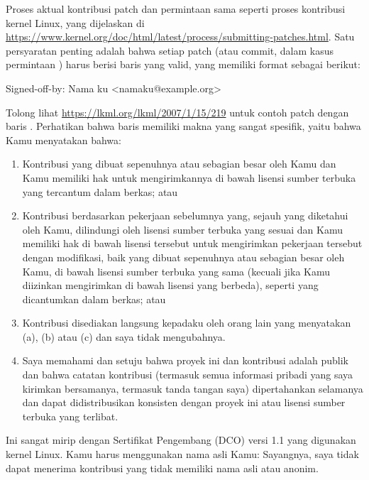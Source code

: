 Proses aktual kontribusi patch dan permintaan  sama seperti
proses kontribusi kernel Linux, yang dijelaskan di
\url{https://www.kernel.org/doc/html/latest/process/submitting-patches.html}.
Satu persyaratan penting adalah bahwa setiap patch (atau commit, dalam
kasus permintaan ) harus berisi baris  yang
valid, yang memiliki format sebagai berikut:

\begin{VerbatimU}
Signed-off-by: Nama ku <namaku@example.org>
\end{VerbatimU}

Tolong lihat \url{https://lkml.org/lkml/2007/1/15/219} untuk contoh patch
dengan baris .
Perhatikan bahwa baris  memiliki makna yang sangat
spesifik, yaitu bahwa Kamu menyatakan bahwa:

\begin{enumerate}[label={(\alph*)}]
\item 	Kontribusi yang dibuat sepenuhnya atau sebagian besar oleh Kamu
	dan Kamu memiliki hak untuk mengirimkannya di bawah lisensi
	sumber terbuka yang tercantum dalam berkas; atau
\item	Kontribusi berdasarkan pekerjaan sebelumnya yang, sejauh yang
	diketahui oleh Kamu, dilindungi oleh lisensi sumber terbuka yang
	sesuai dan Kamu memiliki hak di bawah lisensi tersebut untuk
	mengirimkan pekerjaan tersebut dengan modifikasi, baik yang
	dibuat sepenuhnya atau sebagian besar oleh Kamu, di bawah
	lisensi sumber terbuka yang sama (kecuali jika Kamu diizinkan
	mengirimkan di bawah lisensi yang berbeda), seperti yang
	dicantumkan dalam berkas; atau
\item	Kontribusi disediakan langsung kepadaku oleh orang lain yang
	menyatakan (a), (b) atau (c) dan saya tidak mengubahnya.
\item	Saya memahami dan setuju bahwa proyek ini dan kontribusi
	adalah publik dan bahwa catatan kontribusi (termasuk semua
	informasi pribadi yang saya kirimkan bersamanya, termasuk
	tanda tangan saya) dipertahankan selamanya dan dapat
	didistribusikan konsisten dengan proyek ini atau lisensi
	sumber terbuka yang terlibat.
\end{enumerate}

Ini sangat mirip dengan Sertifikat Pengembang (DCO) versi 1.1 yang
digunakan kernel Linux.
Kamu harus menggunakan nama asli Kamu:
Sayangnya, saya tidak dapat menerima kontribusi yang tidak memiliki nama
asli atau anonim.

